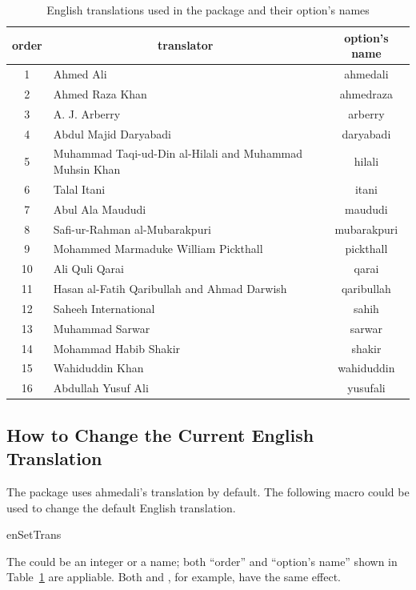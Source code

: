 \documentclass[a4paper]{ltxdoc}
\begin{document}
\begin{table}[!htbp]
\centering
\begin{tabular}{|c|l|c|}
    \toprule
    order & \multicolumn{1}{c|}{translator} & option's name \\\midrule
    1 & Ahmed Ali & ahmedali \\
    2 & Ahmed Raza Khan & ahmedraza \\
    3 & A. J. Arberry & arberry \\
    4 & Abdul Majid Daryabadi & daryabadi \\
    5 & Muhammad Taqi-ud-Din al-Hilali and Muhammad Muhsin Khan & hilali \\
    6 & Talal Itani & itani \\
    7 & Abul Ala Maududi & maududi \\
    8 & Safi-ur-Rahman al-Mubarakpuri & mubarakpuri \\
    9 & Mohammed Marmaduke William Pickthall & pickthall \\
    10 & Ali Quli Qarai & qarai \\
    11 & Hasan al-Fatih Qaribullah and Ahmad Darwish & qaribullah \\
    12 & Saheeh International & sahih \\
    13 & Muhammad Sarwar & sarwar \\
    14 & Mohammad Habib Shakir & shakir \\
    15 & Wahiduddin Khan & wahiduddin \\
    16 & Abdullah Yusuf Ali & yusufali \\
    \bottomrule
\end{tabular}
    \caption{English translations used in the package and their option's names}
    \label{tab:idtrans}
\end{table}

\subsection{How to Change the Current English Translation}
    The  package uses ahmedali's translation by default.
    The following macro could be used to change the default English translation.
    \begin{declcs}{enSetTrans}
    \end{declcs}
    The  could be an integer or a name; both ``order'' and ``option's name''
    shown in Table~\ref{tab:idtrans} are appliable. Both  and , for example,
    have the same effect.
\end{document}
